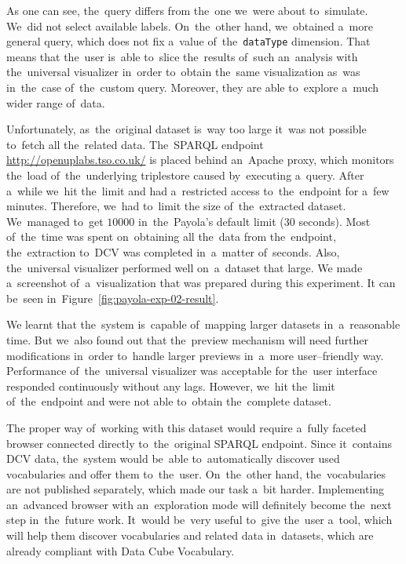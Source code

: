 As one can see, the~query differs from the~one we~were about to~simulate. We~did not select available labels. On~the~other hand, we~obtained a~more general 
query, which does not fix a~value of~the~\texttt{dataType} dimension. That means 
that the~user is~able to~slice the~results of~such an~analysis with the~universal 
visualizer in~order to~obtain the~same visualization as~was in~the~case of~the~custom 
query. Moreover, they are able to~explore a~much wider range of~data.  

\begin{sloppypar}
Unfortunately, as~the~original dataset is~way too large it~was not possible to~fetch all the~related data. The~SPARQL endpoint \mbox{\url{http://openuplabs.tso.co.uk/}}
is placed behind an~Apache proxy, which monitors the~load of~the~underlying 
triplestore caused by~executing a~query. After a~while we~hit the~limit and had a~restricted access to~the~endpoint for a~few minutes. Therefore, we~had to~limit 
the size of~the~extracted dataset. We~managed to~get $10000$ in~the~Payola's 
default limit (30 seconds). Most of~the~time was spent on~obtaining all the~data from the~endpoint, the~extraction to~DCV was completed in~a~matter of~seconds. Also, the~universal visualizer performed well on~a~dataset that large.
We made a~screenshot of~a~visualization that was prepared during this experiment.
It can be~seen in~Figure~\ref{fig:payola-exp-02-result}.
\end{sloppypar}

We learnt that the~system is~capable of~mapping larger datasets in~a~reasonable 
time. But we~also found out that the~preview mechanism will need further 
modifications in~order to~handle larger previews in~a~more user--friendly way. 
Performance of~the~universal visualizer was acceptable for the~user interface 
responded continuously without any lags. However, we~hit the~limit of~the~endpoint and were not able to~obtain the~complete dataset. 

The proper way of~working with this dataset would require a~fully faceted 
browser connected directly to~the~original SPARQL endpoint. Since it~contains 
DCV data, the~system would be~able to~automatically discover used vocabularies 
and offer them to~the~user. On~the~other hand, the~vocabularies are not published
separately, which made our task a~bit harder. Implementing an~advanced browser
with an~exploration mode will definitely become the~next step in~the~future work. It~would be~very useful to~give the~user a~tool, which will help them 
discover vocabularies and related data in~datasets, which are already compliant 
with Data Cube Vocabulary.

